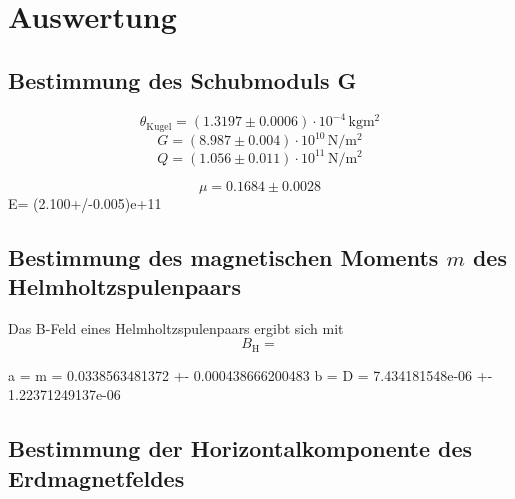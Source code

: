 \section{Auswertung}
\label{sec:Auswertung}
\subsection{Bestimmung des Schubmoduls G}
\begin{equation}
	\theta_{\mathrm{Kugel}}=(1.3197\pm 0.0006) \cdot 10^{-4} \,\si{\kilo\gram \square\metre}
\end{equation}
\begin{equation}
	G= (8.987\pm 0.004) \cdot 10^{10}  \,\si{\newton \per \square\metre}
\end{equation}
\begin{equation}
	Q= (1.056\pm 0.011) \cdot 10^{11}  \,\si{\newton \per \square\metre}
\end{equation}

\begin{equation}
	\mu= 0.1684\pm 0.0028
\end{equation}
E= (2.100+/-0.005)e+11
\subsection{Bestimmung des magnetischen Moments $m$ des Helmholtzspulenpaars}
Das B-Feld eines Helmholtzspulenpaars ergibt sich mit
\begin{equation}
	B_{\mathrm{H}}=
\end{equation}



a = m = 0.0338563481372 +- 0.000438666200483
b = D =  7.434181548e-06 +- 1.22371249137e-06


\FloatBarrier
\subsection{Bestimmung der Horizontalkomponente des Erdmagnetfeldes}

